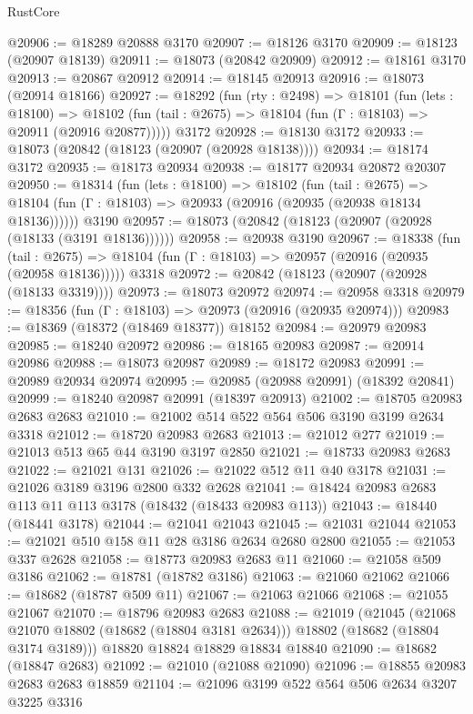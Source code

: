 \begin{lexlean}{RustCore}
\begin{coremodule}
@20906 := @18289 @20888 @3170
@20907 := @18126 @3170
@20909 := @18123 (@20907 @18139)
@20911 := @18073 (@20842 @20909)
@20912 := @18161 @3170
@20913 := @20867 @20912
@20914 := @18145 @20913
@20916 := @18073 (@20914 @18166)
@20927 := @18292
    (fun (rty : @2498) =>
    @18101
      (fun (lets : @18100) =>
      @18102 (fun (tail : @2675) => @18104 (fun (Γ : @18103) => @20911 (@20916 @20877)))))
    @3172
@20928 := @18130 @3172
@20933 := @18073 (@20842 (@18123 (@20907 (@20928 @18138))))
@20934 := @18174 @3172
@20935 := @18173 @20934
@20938 := @18177 @20934 @20872 @20307
@20950 := @18314
    (fun (lets : @18100) =>
    @18102
      (fun (tail : @2675) =>
      @18104 (fun (Γ : @18103) => @20933 (@20916 (@20935 (@20938 @18134 @18136))))))
    @3190
@20957 := @18073 (@20842 (@18123 (@20907 (@20928 (@18133 (@3191 @18136))))))
@20958 := @20938 @3190
@20967 := @18338
    (fun (tail : @2675) => @18104 (fun (Γ : @18103) => @20957 (@20916 (@20935 (@20958 @18136)))))
    @3318
@20972 := @20842 (@18123 (@20907 (@20928 (@18133 @3319))))
@20973 := @18073 @20972
@20974 := @20958 @3318
@20979 := @18356 (fun (Γ : @18103) => @20973 (@20916 (@20935 @20974)))
@20983 := @18369 (@18372 (@18469 @18377)) @18152
@20984 := @20979 @20983
@20985 := @18240 @20972
@20986 := @18165 @20983
@20987 := @20914 @20986
@20988 := @18073 @20987
@20989 := @18172 @20983
@20991 := @20989 @20934 @20974
@20995 := @20985 (@20988 @20991) (@18392 @20841)
@20999 := @18240 @20987 @20991 (@18397 @20913)
@21002 := @18705 @20983 @2683 @2683
@21010 := @21002 @514 @522 @564 @506 @3190 @3199 @2634 @3318
@21012 := @18720 @20983 @2683
@21013 := @21012 @277
@21019 := @21013 @513 @65 @44 @3190 @3197 @2850
@21021 := @18733 @20983 @2683
@21022 := @21021 @131
@21026 := @21022 @512 @11 @40 @3178
@21031 := @21026 @3189 @3196 @2800 @332 @2628
@21041 := @18424 @20983 @2683 @113 @11 @113 @3178 (@18432 (@18433 @20983 @113))
@21043 := @18440 (@18441 @3178)
@21044 := @21041 @21043
@21045 := @21031 @21044
@21053 := @21021 @510 @158 @11 @28 @3186 @2634 @2680 @2800
@21055 := @21053 @337 @2628
@21058 := @18773 @20983 @2683 @11
@21060 := @21058 @509 @3186
@21062 := @18781 (@18782 @3186)
@21063 := @21060 @21062
@21066 := @18682 (@18787 @509 @11)
@21067 := @21063 @21066
@21068 := @21055 @21067
@21070 := @18796 @20983 @2683
@21088 := @21019
    (@21045
      (@21068 @21070 @18802 (@18682 (@18804 @3181 @2634)))
      @18802
      (@18682 (@18804 @3174 @3189)))
    @18820
    @18824
    @18829
    @18834
    @18840
@21090 := @18682 (@18847 @2683)
@21092 := @21010 (@21088 @21090)
@21096 := @18855 @20983 @2683 @2683 @18859
@21104 := @21096 @3199 @522 @564 @506 @2634 @3207 @3225 @3316

\end{coremodule}
\end{lexlean}
